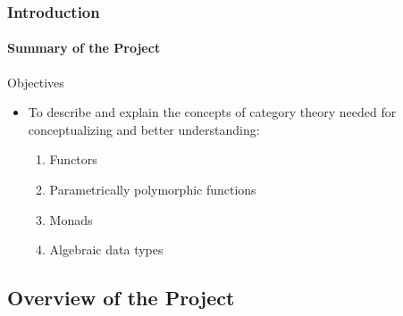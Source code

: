 \documentclass{beamer}
\begin{document}

\begin{frame}[label={objectives}]
  \frametitle{Introduction}
  \framesubtitle{Summary of the Project}

  \begin{block}{Objectives}
    \begin{itemize}
    \item
      To describe and explain the concepts of category theory needed
      for conceptualizing and better understanding:
      \begin{enumerate}
      \item
        Functors
      \item
        Parametrically polymorphic functions
      \item
        Monads
      \item
        Algebraic data types
      \end{enumerate}
    \end{itemize}
  \end{block}

\end{frame}


\subsection[Overview]{Overview of the Project}

\end{document}
